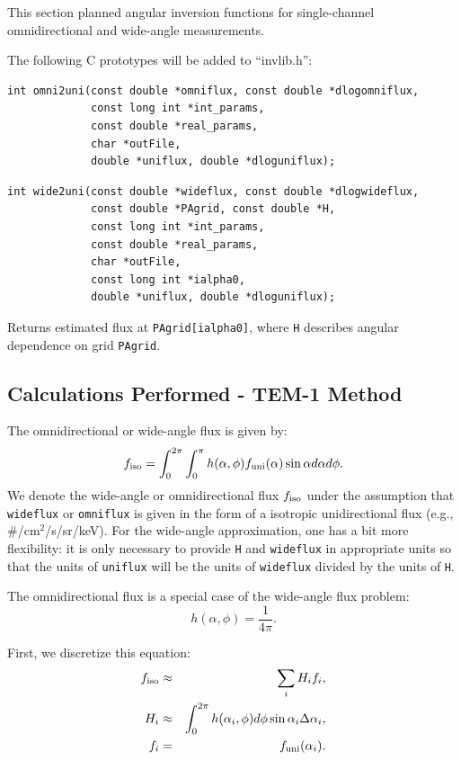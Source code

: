 \documentclass{article}    %
\begin{document}
This section planned angular inversion functions for
single-channel omnidirectional and wide-angle measurements.

The following C prototypes will be added to ``invlib.h'':
\begin{verbatim}
int omni2uni(const double *omniflux, const double *dlogomniflux,
             const long int *int_params, 
             const double *real_params,
             char *outFile, 
             double *uniflux, double *dloguniflux);
\end{verbatim}

\begin{verbatim}
int wide2uni(const double *wideflux, const double *dlogwideflux,
             const double *PAgrid, const double *H, 
             const long int *int_params, 
             const double *real_params,
             char *outFile,
             const long int *ialpha0,
             double *uniflux, double *dloguniflux);
\end{verbatim}
Returns estimated flux at \verb|PAgrid[ialpha0]|, where \verb|H|
describes angular dependence on grid \verb|PAgrid|.

\subsection{Calculations Performed - TEM-1 Method}

The omnidirectional or wide-angle flux is given by:
\begin{equation}
f_{\rm iso} = \int_0^{2\pi} \int_0^{\pi} h(\alpha,\phi) f_{\rm uni}(\alpha) \sin\alpha d\alpha d\phi.
\end{equation}
We denote the wide-angle or omnidirectional flux $f_{\rm iso}$ under
the assumption that \verb|wideflux| or \verb|omniflux| is given in
the form of a isotropic unidirectional flux (e.g., \#/cm$^2$/s/sr/keV).
For the wide-angle approximation, one has a bit more flexibility: it
is only necessary to provide \verb|H| and \verb|wideflux| in
appropriate units so that the units of \verb|uniflux| will be the
units of \verb|wideflux| divided by the units of \verb|H|.

The omnidirectional flux is a special case of the wide-angle flux problem:
\begin{equation}
h(\alpha,\phi) = \frac{1}{4\pi}.
\end{equation}

First, we discretize this equation:
\begin{eqnarray}
f_{\rm iso} &\approx& \sum_i H_i f_i, \\ 
H_i &\approx& \int_0^{2\pi} h(\alpha_i,\phi) d\phi \sin\alpha_i \Delta\alpha_i, \\
f_i &=& f_{\rm uni}(\alpha_i).
\end{eqnarray}
\end{document}
